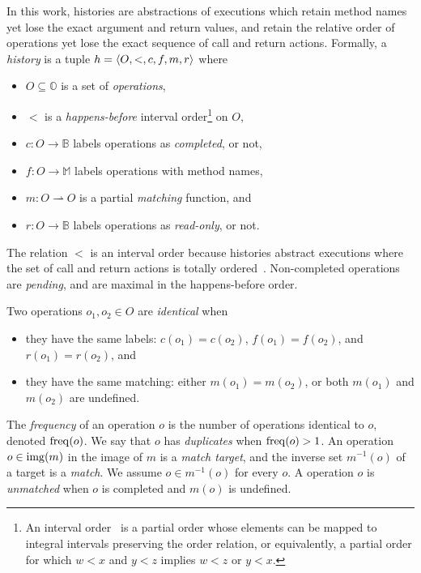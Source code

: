 In this work, histories are abstractions of executions which retain method
names yet lose the exact argument and return values, and retain the relative
order of operations yet lose the exact sequence of call and return actions.
Formally, a \emph{history} is a tuple $h = {\left\langle{O,<,c,f,m,r}\right\rangle}$ where
\begin{itemize}

  \item $O \subseteq \mathbb{O}$ is a set of \emph{operations},

  \item $<$ is a \emph{happens-before} interval order\footnote{An interval
  order~\cite{books/Fishburn85} is a partial order whose elements can be mapped
  to integral intervals preserving the order relation, or equivalently, a
  partial order for which $w < x$ and $y < z$ implies $w < z$ or $y < x$.} on
  $O$,

  \item $c: O \to \mathbb{B}$ labels operations as \emph{completed}, or not,

  \item $f: O \to \mathbb{M}$ labels operations with method names,

  \item $m: O \rightharpoonup O$ is a partial \emph{matching} function, and

  \item $r: O \to \mathbb{B}$ labels operations as \emph{read-only}, or not.

\end{itemize}
The relation $<$ is an interval order because histories abstract executions where
the set of call and return actions is totally ordered~\cite{conf/popl/BouajjaniEEH15}.
Non-completed operations are \emph{pending}, and are maximal in the
happens-before order. 

Two operations $o_1, o_2 \in O$ are \emph{identical} when
\begin{itemize}

  \item they have the same labels: $c(o_1) = c(o_2)$, $f(o_1)= f(o_2)$, and
  $r(o_1) = r(o_2)$, and

  \item they have the same matching: either $m(o_1) = m(o_2)$, or both $m(o_1)$
  and $m(o_2)$ are undefined.

\end{itemize} 
The \emph{frequency} of an operation $o$ is the number of operations identical
to $o$, denoted $\operatorname{freq}(o)$. We say that $o$ has \emph{duplicates} when
$\operatorname{freq}(o) > 1$. An operation $o \in \operatorname{img}(m)$ in the image of $m$ is a
\emph{match target}, and the inverse set $m^{-1}(o)$ of a target is a
\emph{match}. We assume $o \in m^{-1}(o)$ for every $o$. A operation $o$ is \emph{unmatched}
when $o$ is completed and $m(o)$ is undefined.

